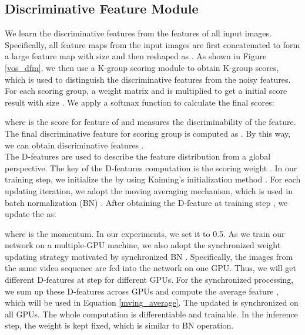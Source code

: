 \documentclass[runningheads]{llncs}
\begin{document}
\subsection{Discriminative Feature Module}\label{sec_dfm}
We learn the discriminative features from the features of all input images. Specifically, all feature maps  from the input images are first concatenated to form a large feature map with size  and then reshaped as . As shown in Figure \ref{vos_dfm}, we then use a K-group scoring module to obtain K-group scores, which is used to distinguish the discriminative features from the noisy features. For each scoring group,   a  weight matrix   and  is multiplied to get a initial score result with size .  We apply a softmax function to calculate the final scores:

where  is the score for  feature of  and  measures the discriminability of the feature. The final discriminative feature for  scoring group is computed as . By this way, we can obtain  discriminative features .\\
\indent The  D-features are used to describe the feature distribution from a global perspective. The key of the  D-features computation is the  scoring weight . In our training step, we initialize the  by using Kaiming’s initialization method \cite{kaiming_initialization}.  For each updating iteration, we adopt the  moving averaging mechanism, which is used in  batch normalization (BN) \cite{batch_normalization}. After obtaining the D-feature  at training step , we update the  as:

where  is the momentum. In our experiments, we set it to 0.5. As we train our network on a multiple-GPU machine, we also adopt the synchronized weight updating strategy motivated by synchronized BN \cite{inplaceabn}. Specifically, the images from the same video sequence are fed into the network on one GPU. Thus, we will get different D-features  at step  for different GPUs. For the synchronized processing, we sum up these D-features  across GPUs and compute the average feature , which will be used in Equation \ref{mving_average}.  The updated  is synchronized on all GPUs. The whole computation is differentiable and trainable. In the inference step, the weight  is kept fixed, which is similar to BN operation.
\end{document}
